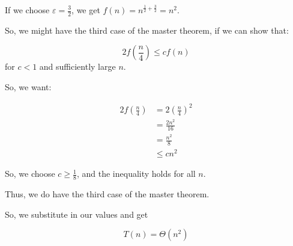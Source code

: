 \documentclass[12pt,letterpaper]{article}
\begin{document}
\begin{enumerate}
\begin{enumerate}
\begin{enumerate}
              If we choose $\varepsilon = \frac{3}{2}$, we get $f(n) = n^{\frac{1}{2} + \frac{3}{2}} = n^2$.

              So, we might have the third case of the master theorem, if we can show that:

              \[2f\left(\frac{n}{4}\right) \le cf(n)\]
              for $c < 1$ and sufficiently large $n$.

              So, we want:

              \begin{align*}
                2f\left(\frac{n}{4}\right) &= 2\left(\frac{n}{4}\right)^2 \\
                &= \frac{2n^2}{16} \\
                &= \frac{n^2}{8} \\
                &\le cn^2
              \end{align*}

              So, we choose $c \ge \frac{1}{8}$, and the inequality holds for all $n$.

              Thus, we do have the third case of the master theorem.

              So, we substitute in our values and get

              \[T(n) = \Theta(n^2)\]
          \end{enumerate}
      \end{enumerate}
  \end{enumerate}
\end{document}
